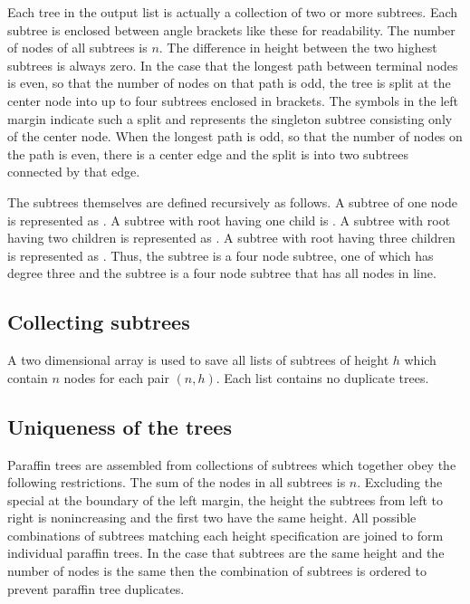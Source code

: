 Each tree in the output list is actually a collection of two or more subtrees.
Each subtree is enclosed between angle brackets like these \svbt{<>} for
readability.
The number of nodes of all subtrees is $n$.  The difference
in height between the two highest subtrees is always zero.  In the case that
the longest path between terminal nodes is even, so that the number of nodes
on that path is odd, the tree is split at the center node into up to four
subtrees enclosed in brackets.  The symbols \svbt{<()>} in the left margin
indicate such a split and represents the singleton subtree consisting only
of the center node.  When the longest path is odd, so that the number of
nodes on the path is even, there is a center edge and the split is into two
subtrees connected by that edge.

The subtrees themselves are defined recursively as follows. A subtree of one
node is represented as \svbt{()}.  A subtree with root having one child is
.  A subtree with root having two
children is represented as
.
A subtree with root having three children is represented as
.  Thus, the subtree \svbt{(() () ())} is a four
node subtree, one of which has degree three and the subtree \svbt{(((())))} is
a four node subtree that has all nodes in line.

\subsection{Collecting subtrees}

A two dimensional array is used to save all lists of subtrees of height $h$
which contain $n$ nodes for each pair $(n,h)$.  Each list contains no duplicate
trees.

\subsection{Uniqueness of the trees}

Paraffin trees are assembled from collections of subtrees which together obey
the following restrictions.  The sum of the nodes in all subtrees is $n$.
Excluding the special \svbt{<()>} at the boundary of the left margin, the height
the subtrees from left to right is nonincreasing and the first two have the
same height.  All possible combinations of subtrees matching each height
specification are joined to form individual paraffin trees.  In the case that
subtrees are the same height and the number of nodes is the same then the
combination of subtrees is ordered to prevent paraffin tree duplicates.

